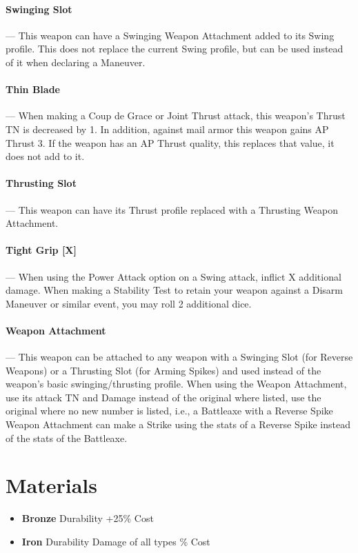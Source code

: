 \documentclass[oneside,11pt,english]{book}
\begin{document}
\paragraph{\label{par:Swinging Slot}Swinging Slot}---\quad
This weapon can have a Swinging Weapon Attachment added to its Swing profile. This does not replace the current Swing profile, but can be used instead of it when declaring a Maneuver.

\paragraph{\label{par:Thin Blade}Thin Blade}---\quad
When making a Coup de Grace or Joint Thrust attack, this weapon’s Thrust TN is decreased by 1. In addition, against mail armor this weapon gains AP Thrust 3. If the weapon has an AP Thrust quality, this replaces that value, it does not add to it.

\paragraph{\label{par:Thrusting Slot}Thrusting Slot}---\quad
This weapon can have its Thrust profile replaced with a Thrusting Weapon Attachment.

\paragraph{\label{par:Tight Grip}Tight Grip [X]}---\quad
When using the Power Attack option on a Swing attack, inflict X additional damage. When making a Stability Test to retain your weapon against a Disarm Maneuver or similar event, you may roll 2 additional dice.

\paragraph{\label{par:Weapon Attachment}Weapon Attachment}---\quad
This weapon can be attached to any weapon with a Swinging Slot (for Reverse Weapons) or a Thrusting Slot (for Arming Spikes) and used instead of the weapon’s basic swinging/thrusting profile. When using the Weapon Attachment, use its attack TN and Damage instead of the original where listed, use the original where no new number is listed, i.e., a Battleaxe with a Reverse Spike Weapon Attachment can make a Strike using the stats of a Reverse Spike instead of the stats of the Battleaxe.

\section{Materials}
\begin{itemize}
	\item [] \textbf{Bronze}
	 Durability
	\subitem +25\% Cost
\end{itemize}
\begin{itemize}
\item [] \textbf{Iron}
 Durability
 Damage of all types
\% Cost
\end{itemize}
\end{document}
